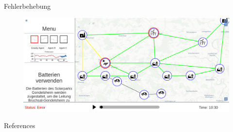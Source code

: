 \documentclass[22pt]{beamer}
\begin{document}
\begin{frame}{Fehlerbehebung}
    \begin{figure}[!h]
      \centering
      \includegraphics[width=115mm]{resources/mark.png}
      \label{fig:projectplan}
    \end{figure}
\end{frame}



\begin{frame}{References}
  
\end{frame}
\end{document}
